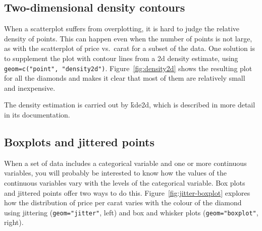 % 


\subsection{Two-dimensional density contours}
\label{sub:density2d}

When a scatterplot suffers from overplotting, it is hard to judge the relative density of points.  This can happen even when the number of points is not large, as with the scatterplot of price vs.\ carat for a subset of the data.  One solution is to supplement the plot with contour lines from a 2d density estimate, using {\tt geom=c("point", "density2d")}.  Figure~\ref{fig:density2d} shows the resulting plot for all the diamonds and makes it clear that most of them are relatively small and inexpensive.

% 


The density estimation is carried out by \f{kde2d}, which is described in more detail in its documentation.

\subsection{Boxplots and jittered points}
\label{sub:boxplot}

When a set of data includes a categorical variable and one or more continuous variables, you will probably be interested to know how the values of the continuous variables vary with the levels of the categorical variable.  Box plots and jittered points offer two ways to do this.  Figure~\ref{fig:jitter-boxplot} explores how the distribution of price per carat varies with the colour of the diamond using jittering ({\tt geom="jitter"}, left) and box and whisker plots ({\tt geom="boxplot"}, right).

% 


